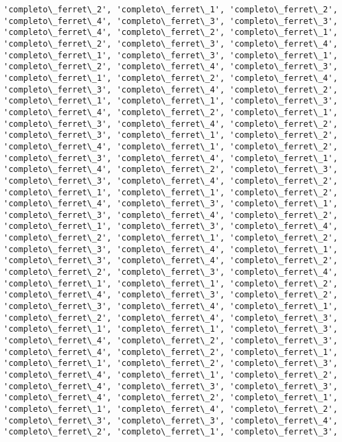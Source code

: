 \documentclass[11pt]{article}
\begin{document}
\begin{Verbatim}[commandchars=\\\{\}]
'completo\_ferret\_2', 'completo\_ferret\_1', 'completo\_ferret\_2',
'completo\_ferret\_4', 'completo\_ferret\_3', 'completo\_ferret\_3',
'completo\_ferret\_4', 'completo\_ferret\_2', 'completo\_ferret\_1',
'completo\_ferret\_2', 'completo\_ferret\_3', 'completo\_ferret\_4',
'completo\_ferret\_1', 'completo\_ferret\_3', 'completo\_ferret\_1',
'completo\_ferret\_2', 'completo\_ferret\_4', 'completo\_ferret\_3',
'completo\_ferret\_1', 'completo\_ferret\_2', 'completo\_ferret\_4',
'completo\_ferret\_3', 'completo\_ferret\_4', 'completo\_ferret\_2',
'completo\_ferret\_1', 'completo\_ferret\_1', 'completo\_ferret\_3',
'completo\_ferret\_4', 'completo\_ferret\_2', 'completo\_ferret\_1',
'completo\_ferret\_3', 'completo\_ferret\_4', 'completo\_ferret\_2',
'completo\_ferret\_3', 'completo\_ferret\_1', 'completo\_ferret\_2',
'completo\_ferret\_4', 'completo\_ferret\_1', 'completo\_ferret\_2',
'completo\_ferret\_3', 'completo\_ferret\_4', 'completo\_ferret\_1',
'completo\_ferret\_4', 'completo\_ferret\_2', 'completo\_ferret\_3',
'completo\_ferret\_3', 'completo\_ferret\_4', 'completo\_ferret\_2',
'completo\_ferret\_1', 'completo\_ferret\_1', 'completo\_ferret\_2',
'completo\_ferret\_4', 'completo\_ferret\_3', 'completo\_ferret\_1',
'completo\_ferret\_3', 'completo\_ferret\_4', 'completo\_ferret\_2',
'completo\_ferret\_1', 'completo\_ferret\_3', 'completo\_ferret\_4',
'completo\_ferret\_2', 'completo\_ferret\_1', 'completo\_ferret\_2',
'completo\_ferret\_3', 'completo\_ferret\_4', 'completo\_ferret\_1',
'completo\_ferret\_3', 'completo\_ferret\_4', 'completo\_ferret\_2',
'completo\_ferret\_2', 'completo\_ferret\_3', 'completo\_ferret\_4',
'completo\_ferret\_1', 'completo\_ferret\_1', 'completo\_ferret\_2',
'completo\_ferret\_4', 'completo\_ferret\_3', 'completo\_ferret\_2',
'completo\_ferret\_3', 'completo\_ferret\_4', 'completo\_ferret\_1',
'completo\_ferret\_2', 'completo\_ferret\_4', 'completo\_ferret\_3',
'completo\_ferret\_1', 'completo\_ferret\_1', 'completo\_ferret\_3',
'completo\_ferret\_4', 'completo\_ferret\_2', 'completo\_ferret\_3',
'completo\_ferret\_4', 'completo\_ferret\_2', 'completo\_ferret\_1',
'completo\_ferret\_1', 'completo\_ferret\_2', 'completo\_ferret\_3',
'completo\_ferret\_4', 'completo\_ferret\_1', 'completo\_ferret\_2',
'completo\_ferret\_4', 'completo\_ferret\_3', 'completo\_ferret\_3',
'completo\_ferret\_4', 'completo\_ferret\_2', 'completo\_ferret\_1',
'completo\_ferret\_1', 'completo\_ferret\_4', 'completo\_ferret\_2',
'completo\_ferret\_3', 'completo\_ferret\_3', 'completo\_ferret\_4',
'completo\_ferret\_2', 'completo\_ferret\_1', 'completo\_ferret\_3',

\end{Verbatim}
\end{document}
